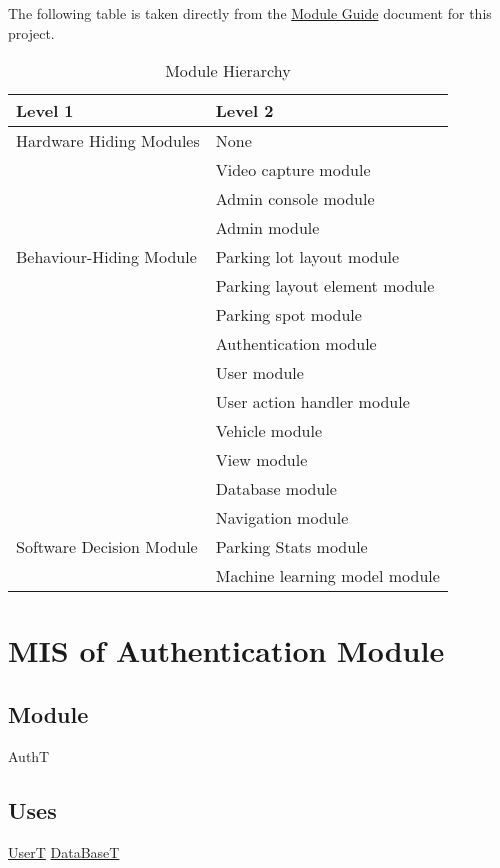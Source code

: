 \documentclass[12pt, titlepage]{article}
\begin{document}
The following table is taken directly from the
\href{https://github.com/parkd-app/park-d/blob/main/docs/Design/MG/MG.pdf}{Module
Guide} document for this project.

\begin{table}[h!]
\centering
\begin{tabular}{p{} p{}}
\toprule
\textbf{Level 1} & \textbf{Level 2}\\
\midrule
Hardware Hiding Modules & None\\
\midrule
\multirow{7}{0.3\textwidth}{Behaviour-Hiding Module} 
& Video capture module\\
& Admin console module\\
& Admin module\\
& Parking lot layout module\\
& Parking layout element module\\
& Parking spot module\\
& Authentication module\\
& User module\\
& User action handler module\\
& Vehicle module\\
& View module\\
& Database module\\
\midrule

\multirow{3}{0.3\textwidth}{Software Decision Module} & Navigation module\\
& Parking Stats module\\
& Machine learning model module\\
\bottomrule

\end{tabular}
\caption{Module Hierarchy}
\label{TblMH}
\end{table}

\newpage

\section{MIS of Authentication Module} 
\label{auth:Module}

\subsection{Module}
AuthT

\subsection{Uses}
\hyperref[user:Module]{UserT}
\hyperref[DB:Module]{DataBaseT}
\end{document}
